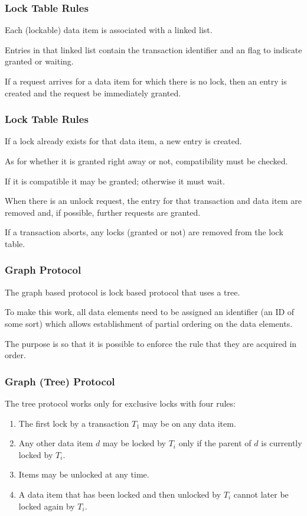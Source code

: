\begin{frame}
\frametitle{Lock Table Rules}

Each (lockable) data item is associated with a linked list. 

Entries in that linked list contain the transaction identifier and an flag to indicate granted or waiting.

If a request arrives for a data item for which there is no lock, then an entry is created and the request be immediately granted. 

\end{frame}

\begin{frame}
\frametitle{Lock Table Rules}
If a lock already exists for that data item, a new entry is created. 

As for whether it is granted right away or not, compatibility must be checked. 

If it is compatible it may be granted; otherwise it must wait. 

When there is an unlock request, the entry for that transaction and data item are removed and, if possible, further requests are granted. 

If a transaction aborts, any locks (granted or not) are removed from the lock table.

\end{frame}

\begin{frame}
\frametitle{Graph Protocol}

The graph based protocol is lock based protocol that uses a tree. 

To make this work, all data elements need to be assigned an identifier (an ID of some sort) which allows establishment of partial ordering on the data elements. 

The purpose is so that it is possible to enforce the rule that they are acquired in order.


\end{frame}

\begin{frame}
\frametitle{Graph (Tree) Protocol}

The tree protocol works only for exclusive locks with four rules:

\begin{enumerate}
	\item The first lock by a transaction $T_{1}$ may be on any data item.
	\item Any other data item $d$ may be locked by $T_{i}$ only if the parent of $d$ is currently locked by $T_{i}$.
	\item Items may be unlocked at any time.
	\item A data item that has been locked and then unlocked by $T_{i}$ cannot later be locked again by $T_{i}$.
\end{enumerate}

\end{frame}


